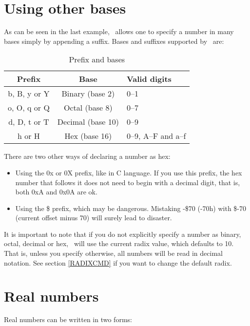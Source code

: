 \documentclass[a4paper,draft,12pt]{book}
\begin{document}
\section{Using other bases}
As can be seen in the last example, \popasm\ allows one to specify a
number in many bases simply by appending a suffix. Bases and suffixes
supported by \popasm\ are:

\begin{table}[h]
\begin{center}
\begin{tabular}[h]{ccl}
Prefix & Base & Valid digits\\
\hline
b, B, y or Y & Binary (base 2)  & 0--1 \\
o, O, q or Q & Octal (base 8)  & 0--7 \\
d, D, t or T & Decimal (base 10)  & 0--9 \\
h or H & Hex (base 16)  & 0--9, A--F and a--f\protect{\footnotemark}\\
\hline
\end{tabular}
\caption{Prefix and bases}
\end{center}
\end{table}


There are two other ways of declaring a number as hex:

\begin{itemize}
\item{Using the 0x or 0X prefix}, like in C language. If you use this
   prefix, the hex number that follows it does not need to begin with
   a decimal digit, that is, both 0xA and 0x0A are ok.
\item{Using the \$ prefix}, which may be dangerous. Mistaking -\$70 (-70h)
   with \$-70 (current offset minus 70) will surely lead to disaster.
\end{itemize}

It is important to note that if you do not explicitly specify a number
as binary, octal, decimal or hex, \popasm\ will use the current radix
value, which defaults to 10. That is, unless you specify otherwise, all
numbers will be read in decimal notation. See section \ref{RADIXCMD} if
you want to change the default radix.

\section{Real numbers}
Real numbers can be written in two forms:
\end{document}
